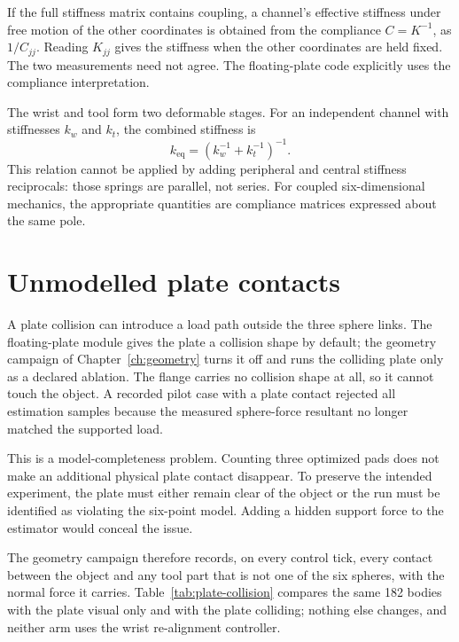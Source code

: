 If the full stiffness matrix contains coupling, a channel's effective stiffness under free motion of the other coordinates is obtained from the compliance $C=K^{-1}$, as $1/C_{jj}$. Reading $K_{jj}$ gives the stiffness when the other coordinates are held fixed. The two measurements need not agree. The floating-plate code explicitly uses the compliance interpretation.

The wrist and tool form two deformable stages. For an independent channel with stiffnesses $k_w$ and $k_t$, the combined stiffness is
\begin{equation}
k_{\mathrm{eq}}=\left(k_w^{-1}+k_t^{-1}\right)^{-1}.
\end{equation}
This relation cannot be applied by adding peripheral and central stiffness reciprocals: those springs are parallel, not series. For coupled six-dimensional mechanics, the appropriate quantities are compliance matrices expressed about the same pole.

\section{Unmodelled plate contacts}

A plate collision can introduce a load path outside the three sphere links. The floating-plate module gives the plate a collision shape by default; the geometry campaign of Chapter~\ref{ch:geometry} turns it off and runs the colliding plate only as a declared ablation. The flange carries no collision shape at all, so it cannot touch the object. A recorded pilot case with a plate contact rejected all estimation samples because the measured sphere-force resultant no longer matched the supported load.

This is a model-completeness problem. Counting three optimized pads does not make an additional physical plate contact disappear. To preserve the intended experiment, the plate must either remain clear of the object or the run must be identified as violating the six-point model. Adding a hidden support force to the estimator would conceal the issue.

The geometry campaign therefore records, on every control tick, every contact between the object and any tool part that is not one of the six spheres, with the normal force it carries. Table~\ref{tab:plate-collision} compares the same 182 bodies with the plate visual only and with the plate colliding; nothing else changes, and neither arm uses the wrist re-alignment controller.

